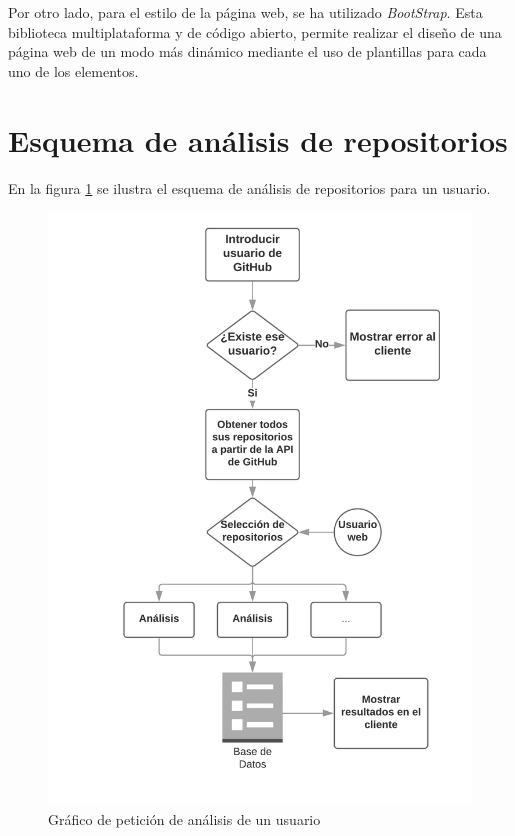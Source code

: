 \documentclass[a4paper, 12pt]{book}
\begin{document}
Por otro lado, para el estilo de la página web, se ha utilizado \textit{BootStrap}. Esta biblioteca multiplataforma y de código abierto, permite realizar el diseño de una página web de un modo más dinámico mediante el uso de plantillas para cada uno de los elementos.

\section{Esquema de análisis de repositorios}

En la figura \ref{fig:oneuser} se ilustra el esquema de análisis de repositorios para un usuario.

\begin{figure}
    \centering
    \includegraphics{img/pedir_repos_user.png}
    \caption{Gráfico de petición de análisis de un usuario}
    \label{fig:oneuser}
\end{figure}
\end{document}
